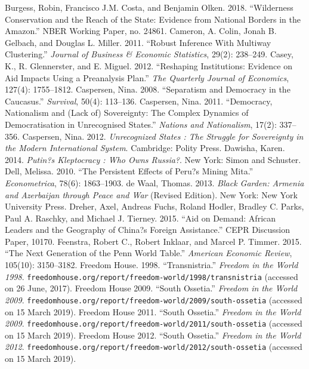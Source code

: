 \documentclass[12pt,a4paper]{article}%
\begin{document}
\begin{thebibliography}{99}
\bibitem{} Burgess, Robin, Francisco J.M. Costa, and Benjamin Olken. 2018. ``Wilderness Conservation and the Reach of the State: Evidence from National Borders in the Amazon.'' NBER Working Paper, no. 24861.                                                                      
\bibitem{} Cameron, A. Colin, Jonah B. Gelbach, and Douglas L. Miller. 2011. ``Robust Inference With Multiway Clustering.'' \textit{Journal of Business \& Economic Statistics}, 29(2): 238--249.
\bibitem{} Casey, K., R. Glennerster, and E. Miguel. 2012. ``Reshaping Institutions: Evidence on Aid Impacts Using a Preanalysis Plan.'' \textit{The Quarterly Journal of Economics}, 127(4): 1755--1812.
\bibitem{} Caspersen, Nina. 2008. ``Separatism and Democracy in the Caucasus.'' \textit{Survival}, 50(4): 113--136.
\bibitem{} Caspersen, Nina. 2011. ``Democracy, Nationalism and (Lack of) Sovereignty: The Complex Dynamics of Democratisation in Unrecognised States.'' \textit{Nations and Nationalism}, 17(2): 337--356.
\bibitem{} Caspersen, Nina. 2012. \textit{Unrecognized States : The Struggle for Sovereignty in the Modern International System}. Cambridge: Polity Press.
\bibitem{} Dawisha, Karen. 2014. \textit{Putin?s Kleptocracy : Who Owns Russia?}. New York: Simon and Schuster.
\bibitem{} Dell, Melissa. 2010. ``The Persistent Effects of Peru?s Mining Mita.'' \textit{Econometrica}, 78(6): 1863--1903.
\bibitem{} de Waal, Thomas. 2013. \textit{Black Garden: Armenia and Azerbaijan through Peace and War} (Revised Edition). New York: New York University Press.
\bibitem{} Dreher, Axel, Andreas Fuchs, Roland Hodler, Bradley C. Parks, Paul A. Raschky, and Michael J. Tierney. 2015. ``Aid on Demand: African Leaders and the Geography of China?s Foreign Assistance.'' CEPR Discussion Paper, 10170.
\bibitem{} Feenstra, Robert C., Robert Inklaar, and Marcel P. Timmer. 2015. ``The Next Generation of the Penn World Table.'' \textit{American Economic Review}, 105(10): 3150--3182.
\bibitem{} Freedom House. 1998. ``Transnistria.'' \textit{Freedom in the World 1998}. \verb!freedomhouse.org/report/freedom-world/1998/transnistria! (accessed on 26 June, 2017). 
\bibitem{} Freedom House 2009. ``South Ossetia.'' \textit{Freedom in the World 2009}. \verb!freedomhouse.org/report/freedom-world/2009/south-ossetia! (accessed on 15 March 2019).
\bibitem{} Freedom House 2011. ``South Ossetia.'' \textit{Freedom in the World 2009}. \verb!freedomhouse.org/report/freedom-world/2011/south-ossetia! (accessed on 15 March 2019).
\bibitem{} Freedom House 2012. ``South Ossetia.'' \textit{Freedom in the World 2012}. \verb!freedomhouse.org/report/freedom-world/2012/south-ossetia! (accessed on 15 March 2019).

\end{thebibliography}
\end{document}
